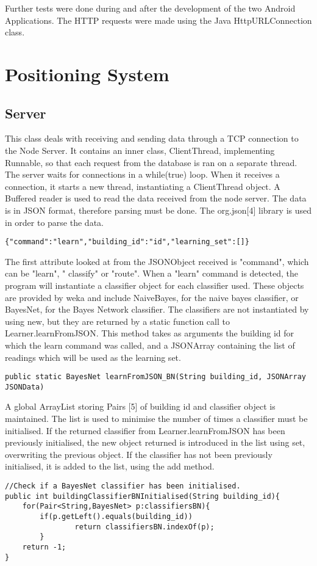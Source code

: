 Further tests were done during and after the development of the two Android Applications. The HTTP requests were made using the Java HttpURLConnection class.

\section{Positioning System}

\subsection{Server}
This class deals with receiving and sending data through a TCP connection to the Node Server. 
It contains an inner class, ClientThread, implementing Runnable, so that each request from the database is ran on a separate thread. The server waits for connections in a while(true) loop. When it receives a connection, it starts a new thread, instantiating a ClientThread object. A Buffered reader is used to read the data received from the node server. The data is in JSON format, therefore parsing must be done. The org.json[4] library is used in order to parse the data. 
\begin{lstlisting} 
{"command":"learn","building_id":"id","learning_set":[]}
\end{lstlisting}
The first attribute looked at from the JSONObject received is "command", which can be  "learn", " classify" or "route". 
When a "learn" command is detected, the program will instantiate a classifier object for each classifier used. These objects are provided by weka and include NaiveBayes, for the naive bayes classifier, or BayesNet, for the Bayes Network classifier. 
The classifiers are not instantiated by using new, but they are returned by a static function call to Learner.learnFromJSON. This method takes as arguments the building id for which the learn command was called, and a JSONArray containing the list of readings which will be used as the learning set. 
\begin{lstlisting} 
public static BayesNet learnFromJSON_BN(String building_id, JSONArray JSONData)
\end{lstlisting}
 A global ArrayList storing Pairs [5] of building id and classifier object is maintained. The list is used to minimise the number of times a classifier must be initialised. If the returned classifier from Learner.learnFromJSON has been previously initialised, the new object returned is introduced in the list using set, overwriting the previous object. If the classifier has not been previously initialised, it is added to the list, using the add method. 
\begin{lstlisting}
//Check if a BayesNet classifier has been initialised.	
public int buildingClassifierBNInitialised(String building_id){
	for(Pair<String,BayesNet> p:classifiersBN){
		if(p.getLeft().equals(building_id))
        		return classifiersBN.indexOf(p);
        }
    return -1;
}    
\end{lstlisting}

